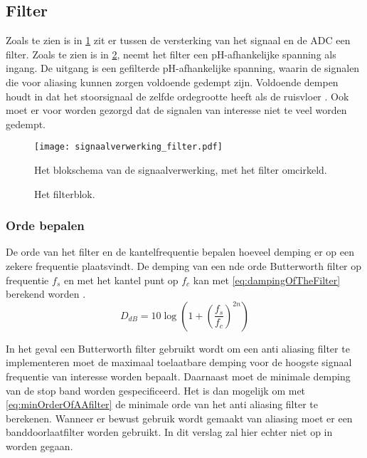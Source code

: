 \subsection{Filter}
Zoals te zien is in \cref{fig:filterInSchema} zit er tussen de versterking van het signaal en de ADC een filter. Zoals te zien is in \cref{fig:filterBlok}, neemt het filter een pH-afhankelijke spanning als ingang. De uitgang is een gefilterde pH-afhankelijke spanning, waarin de signalen die voor aliasing kunnen zorgen voldoende gedempt zijn. Voldoende dempen houdt in dat het stoorsignaal de zelfde ordegrootte heeft als de ruisvloer \cite{energieZuinigeSystemenOntwerpen}. Ook moet er voor worden gezorgd dat de signalen van interesse niet te veel worden gedempt.
\begin{figure}[!htb]
    \centering
    \texttt{[image: signaalverwerking\_filter.pdf]}
    \caption{Het blokschema van de signaalverwerking, met het filter omcirkeld.}
    \label{fig:filterInSchema}
\end{figure}

\begin{figure}[!htb]
    \centering
    \def\svgwidth{0.4\textwidth}
    
    \caption{Het filterblok.}
    \label{fig:filterBlok}
\end{figure}


\subsubsection{Orde bepalen} \label{sec:DetermineAAorder}
De orde van het filter en de kantelfrequentie bepalen hoeveel demping er op een zekere frequentie plaatsvindt. De demping van een nde orde Butterworth filter op frequentie $f_s$ en met het kantel punt op $f_c$ kan met \cref{eq:dampingOfTheFilter} berekend worden \cite{electronicFilterDesignHandbook}.
\begin{equation} \label{eq:dampingOfTheFilter}
    D_{dB}=10\log\left(1+\left(\frac{f_s}{f_c}\right)^{2n}\right)
\end{equation}

In het geval een Butterworth filter gebruikt wordt om een anti aliasing filter te implementeren moet de maximaal toelaatbare demping voor de hoogste signaal frequentie van interesse worden bepaalt. Daarnaast moet de minimale demping van de stop band worden gespecificeerd. Het is dan mogelijk om met \cref{eq:minOrderOfAAfilter} de minimale orde van het anti aliasing filter te berekenen.
Wanneer er bewust gebruik wordt gemaakt van aliasing moet er een banddoorlaatfilter worden gebruikt. In dit verslag zal hier echter niet op in worden gegaan.

